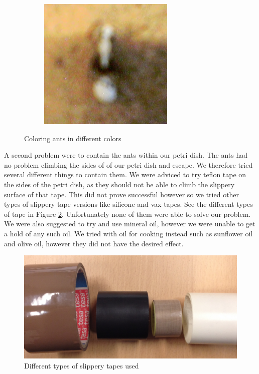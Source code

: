 \begin{figure}
\begin{subfigure}[b]{0.35\textwidth}
                \caption{}
        \end{subfigure}
		\quad
        \begin{subfigure}[b]{0.35\textwidth}
                \includegraphics[scale = 0.5]{img/white_ant}
                \caption{}
        \end{subfigure}
        \caption{Coloring ants in different colors}
		\label{fig:antcoloring}
\end{figure}

A second problem were to contain the ants within our petri dish. The ants had no problem climbing the sides of of our petri dish and escape. We therefore tried several different things to contain them. We were adviced to try teflon tape on the sides of the petri dish, as they should not be able to climb the slippery surface of that tape. This did not prove successful however so we tried other types of slippery tape versions like silicone and vax tapes. See the different types of tape in Figure \ref{fig:tape}. Unfortunately none of them were able to solve our problem. We were also suggested to try and use mineral oil, however we were unable to get a hold of any such oil. We tried with oil for cooking instead such as sunflower oil and olive oil, however they did not have the desired effect.\\

\begin{figure}[ht!]
  \centering
    \includegraphics[scale=0.25]{img/tape}
  \caption{Different types of slippery tapes used}
  \label{fig:tape}
\end{figure}

